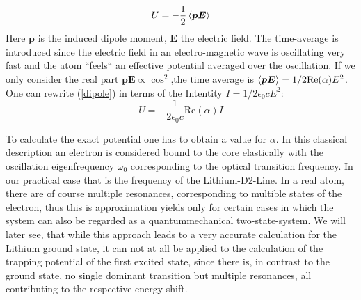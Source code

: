\begin{equation}
U=-\frac{1}{2}\left\langle \boldsymbol{p E}\right\rangle
\label{dipole}
\end{equation} 
Here $\boldsymbol{p}$ is the induced dipole moment, $\boldsymbol{E}$ the electric field. The time-average is introduced since the electric field in an electro-magnetic wave is oscillating very fast and the atom “feels“ an effective potential averaged over the oscillation. If we only consider the real part $\boldsymbol{p}\boldsymbol{E}\propto \cos^2$,the time average is $\left\langle \boldsymbol{p}\boldsymbol{E}\right\rangle=1/2 \mathrm{ Re}(\alpha)E^2$. One can rewrite (\ref{dipole}) in terms of the Intentity $I=1/2\epsilon_0cE^2 $:
\begin{equation}
U=-\frac{1}{2\epsilon_0 c}\mathrm{Re}(\alpha)I
\end{equation} 

To calculate the exact potential one has to obtain a value for $\alpha$. In this classical description an electron is considered bound to the core elastically with the oscillation eigenfrequency $\omega_0$ corresponding to the optical transition frequency. In our practical case that is the frequency of the Lithium-D2-Line. In a real atom, there are of course multiple resonances, corresponding to multible states of the electron, thus this is approximation yields only for certain cases in which the system can also be regarded as a quantummechanical two-state-system. We will later see, that while this approach leads to a very accurate calculation for the Lithium ground state, it can not at all be applied to the calculation of the trapping potential of the first excited state, since there is, in contrast to the ground state, no single dominant transition but multiple resonances, all contributing to the respective energy-shift.

